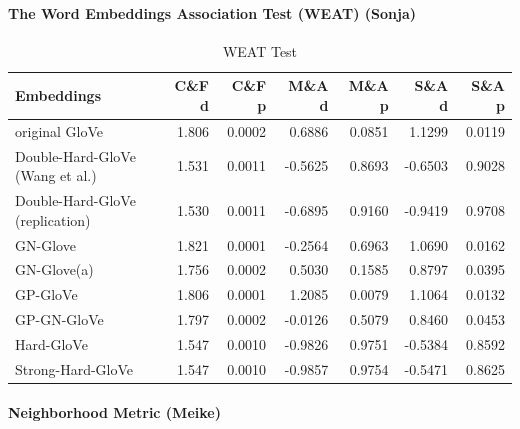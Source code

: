 \documentclass[
  english,
  man,floatsintext]{apa6}
\let\oldparagraph\paragraph
\renewcommand{\paragraph}[1]{\oldparagraph{#1}\mbox{}}
\begin{document}
\hypertarget{the-word-embeddings-association-test-weat-sonja}{%
\paragraph{The Word Embeddings Association Test (WEAT) (Sonja)}\label{the-word-embeddings-association-test-weat-sonja}}

\begin{table}

\caption{\label{tab:unnamed-chunk-1}WEAT Test}
\centering
\begin{tabular}[t]{l|r|r|r|r|r|r}
\hline
Embeddings & C\&F d & C\&F p & M\&A d & M\&A p & S\&A d & S\&A p\\
\hline
original GloVe & 1.806 & 0.0002 & 0.6886 & 0.0851 & 1.1299 & 0.0119\\
\hline
Double-Hard-GloVe (Wang et al.) & 1.531 & 0.0011 & -0.5625 & 0.8693 & -0.6503 & 0.9028\\
\hline
Double-Hard-GloVe (replication) & 1.530 & 0.0011 & -0.6895 & 0.9160 & -0.9419 & 0.9708\\
\hline
GN-Glove & 1.821 & 0.0001 & -0.2564 & 0.6963 & 1.0690 & 0.0162\\
\hline
GN-Glove(a) & 1.756 & 0.0002 & 0.5030 & 0.1585 & 0.8797 & 0.0395\\
\hline
GP-GloVe & 1.806 & 0.0001 & 1.2085 & 0.0079 & 1.1064 & 0.0132\\
\hline
GP-GN-GloVe & 1.797 & 0.0002 & -0.0126 & 0.5079 & 0.8460 & 0.0453\\
\hline
Hard-GloVe & 1.547 & 0.0010 & -0.9826 & 0.9751 & -0.5384 & 0.8592\\
\hline
Strong-Hard-GloVe & 1.547 & 0.0010 & -0.9857 & 0.9754 & -0.5471 & 0.8625\\
\hline
\end{tabular}
\end{table}

\hypertarget{neighborhood-metric-meike}{%
\paragraph{Neighborhood Metric (Meike)}\label{neighborhood-metric-meike}}
\end{document}
